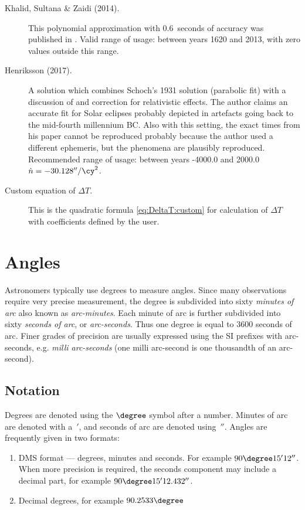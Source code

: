 \begin{description}
\item[Khalid, Sultana \& Zaidi (2014).] This polynomial approximation with 0.6~seconds 
  of accuracy was published in . 
  Valid range of usage: between years 1620 and 2013, with zero values outside this range.

\item[Henriksson (2017).]  A solution which combines Schoch's 1931
  solution (parabolic fit) with a discussion of and correction for relativistic effects.  The author
  claims an accurate fit for Solar eclipses probably depicted in artefacts going back to the mid-fourth
  millennium BC.
  Also with this setting, the exact times from his paper \citep{Henriksson:2017} cannot be
  reproduced probably because the author used a different ephemeris, but the phenomena are
  plausibly reproduced.
  Recommended range of usage: between years -4000.0 and 2000.0 $\dot{n}=-30.128''/\cy^2$.

\item[Custom equation of $\Delta T$.] This is the quadratic formula \ref{eq:DeltaT:custom} for
  calculation of $\Delta T$ with coefficients defined by the user.
\end{description}


\section{Angles}
\label{sec:Concepts:Angles}

Astronomers typically use degrees to measure angles. Since many
observations require very precise measurement, the degree is subdivided
into sixty \emph{minutes of arc} also known as \emph{arc-minutes}. Each
minute of arc is further subdivided into sixty \emph{seconds of arc}, or
\emph{arc-seconds}. Thus one degree is equal to 3600 seconds of arc.
Finer grades of precision are usually expressed using the SI prefixes
with arc-seconds, e.g. \emph{milli arc-seconds} (one milli arc-second is
one thousandth of an arc-second).

\subsection{Notation}

Degrees are denoted using the $\degree$ symbol after a number. Minutes of arc are denoted with a~$'$, and seconds of arc are denoted using~$''$. Angles are frequently given in two formats:

\begin{enumerate}
\item
  DMS format --- degrees, minutes and seconds. For example $90\degree15'12''$.
  When more precision is required, the seconds component may include a
  decimal part, for example $90\degree15'12.432''$.
\item
  Decimal degrees, for example $90.2533\degree$
\end{enumerate}

